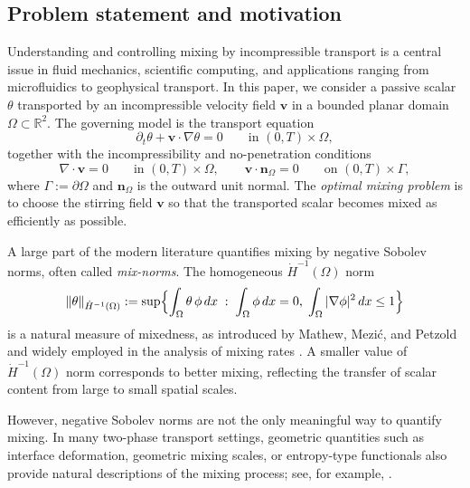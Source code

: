 \documentclass[12pt, reqno]{amsart}
\theoremstyle{plain}
\theoremstyle{definition}
\numberwithin{equation}{section}
\numberwithin{figure}{section}
\numberwithin{algorithm}{section}
\begin{document}
\subsection{Problem statement and motivation}\label{sec:problem}
Understanding and controlling mixing by incompressible transport is a central issue in fluid mechanics, scientific computing, and applications ranging from microfluidics to geophysical transport. In this paper, we consider a passive scalar $\theta$ transported by an incompressible velocity field $\mathbf v$ in a bounded planar domain $\Omega\subset\mathbb R^2$. The governing model is the transport equation
\begin{equation}\label{eq:transport}
\partial_t\theta+\mathbf v\cdot\nabla\theta=0
\qquad\text{in }(0,T)\times\Omega,
\end{equation}
together with the incompressibility and no-penetration conditions
\begin{equation}\label{eq:incomp_bc}
\nabla\cdot\mathbf v=0
\qquad\text{in }(0,T)\times\Omega,
\qquad
\mathbf v\cdot\mathbf n_\Omega=0
\qquad\text{on }(0,T)\times\Gamma,
\end{equation}
where $\Gamma:=\partial\Omega$ and $\mathbf n_\Omega$ is the outward unit normal. The \emph{optimal mixing problem} is to choose the stirring field $\mathbf v$ so that the transported scalar becomes mixed as efficiently as possible.

A large part of the modern literature quantifies mixing by negative Sobolev norms, often called \emph{mix-norms}. The homogeneous $\dot{H}^{-1}(\Omega)$ norm
\begin{equation}\label{eq:mixnorm}
\|\theta\|_{\dot{H}^{-1}(\Omega)}
:=\sup\Bigl\{
\int_\Omega\theta\,\phi\,dx
\;:\;
\int_\Omega\phi\,dx=0,\;
\int_\Omega|\nabla\phi|^2\,dx\le 1
\Bigr\}
\end{equation}
is a natural measure of mixedness, as introduced by Mathew, Mezi\'c, and Petzold \cite{mathew2005multiscale} and widely employed in the analysis of mixing rates \cite{crippa2017cellular}. A smaller value of $\dot{H}^{-1}(\Omega)$ norm corresponds to better mixing, reflecting the transfer of scalar content from large to small spatial scales.

However, negative Sobolev norms are not the only meaningful way to quantify mixing. In many two-phase transport settings, geometric quantities such as interface deformation, geometric mixing scales, or entropy-type functionals also provide natural descriptions of the mixing process; see, for example, \cite{vikhansky2002enhancement, alberti2016exponential, thiffeault2012using}.
\end{document}
